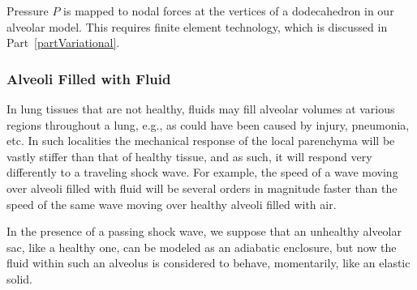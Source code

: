 Pressure $P$ is mapped to nodal forces at the vertices of a dodecahedron in our alveolar model.  This requires finite element technology, which is discussed in Part~\ref{partVariational}.

\subsubsection{Alveoli Filled with Fluid}

In lung tissues that are not healthy, fluids may fill alveolar volumes at various regions throughout a lung, e.g., as could have been caused by injury, pneumonia, etc.  In such localities the mechanical response of the local parenchyma will be vastly stiffer than that of healthy tissue, and as such, it will respond very differently to a traveling shock wave.  For example, the speed of a wave moving over alveoli filled with fluid will be several orders in magnitude faster than the speed of the same wave moving over healthy alveoli filled with air.

In the presence of a passing shock wave, we suppose that an unhealthy alveolar sac, like a healthy one, can be modeled as an adiabatic enclosure, but now the fluid within such an alveolus is considered to behave, momentarily, like an elastic solid.

